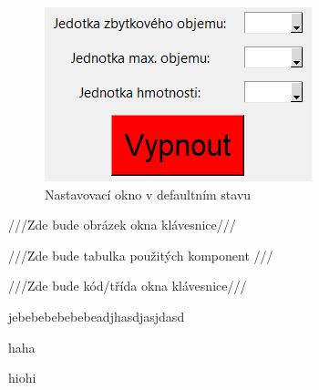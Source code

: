
\begin{figure}[!h]
    \begin{center}
        \includegraphics[scale=2]{obrazky/settings_okno.PNG}
    \end{center}
    \caption{Nastavovací okno v defaultním stavu}
    \label{putty}
\end{figure}


///Zde bude obrázek okna klávesnice///

///Zde bude tabulka použitých komponent ///

///Zde bude kód/třída okna klávesnice///

jebebebebebebeadjhasdjasjdasd

haha

hiohi